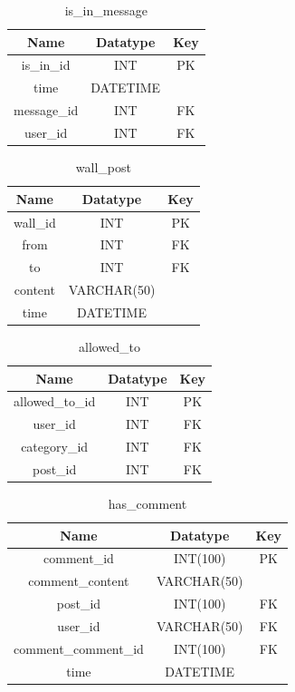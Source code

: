 \begin{table}[!ht]
\caption{is\_in\_message}
\centering
\begin{tabular}{c c c}
\hline\hline
Name               & Datatype        & Key \\
\hline
is\_in\_id         & INT             & PK  \\
time               & DATETIME        &     \\
message\_id        & INT             & FK  \\
user\_id           & INT             & FK  \\
\hline
\end{tabular}
\label{table:nonlin}
\end{table}

\begin{table}[!ht]
\caption{wall\_post}
\centering
\begin{tabular}{c c c}
\hline\hline
Name                    & Datatype    & Key \\
\hline
wall\_id                & INT         & PK  \\
from                    & INT         & FK  \\
to                      & INT         & FK  \\
content                 & VARCHAR(50) &     \\
time                    & DATETIME    &     \\
\hline
\end{tabular}
\label{table:nonlin}
\end{table}

\begin{table}[!ht]
\caption{allowed\_to}
\centering
\begin{tabular}{c c c}
\hline\hline
Name                    & Datatype    & Key \\
\hline
allowed\_to\_id         & INT         & PK  \\
user\_id                & INT         & FK  \\
category\_id            & INT         & FK  \\
post\_id                & INT         & FK  \\
\hline
\end{tabular}
\label{table:nonlin}
\end{table}

\begin{table}[!ht]
\caption{has\_comment}
\centering
\begin{tabular}{c c c}
\hline\hline
Name                 & Datatype     & Key \\
\hline
comment\_id          & INT(100)     & PK  \\
comment\_content     & VARCHAR(50)  &     \\
post\_id             & INT(100)     & FK  \\
user\_id             & VARCHAR(50)  & FK  \\
comment\_comment\_id & INT(100)     & FK   \\
time                 & DATETIME     &     \\
\hline
\end{tabular}
\label{table:nonlin}
\end{table}

